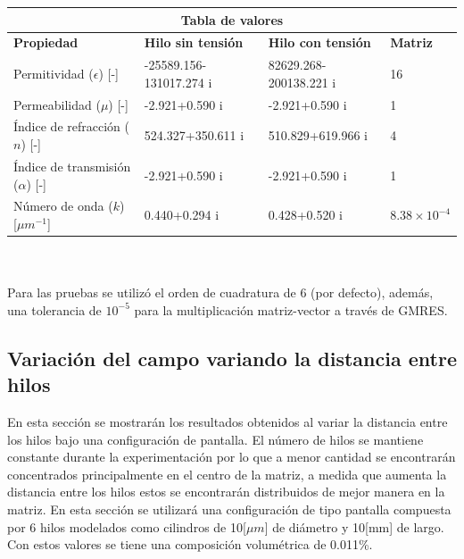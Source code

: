 \documentclass[12pt,letterpaper]{article}
\numberwithin{equation}{section}
\begin{document}
\hspace{-15mm}
\begin{tabular}{ |p{4.78cm}||p{4.5cm}|p{4.5cm}|p{3cm}|  }
	\hline
	\multicolumn{4}{|c|}{\textbf{Tabla de valores}} \\
	\hline
	\textbf{Propiedad} & \textbf{Hilo sin tensión} & \textbf{Hilo con tensión} & \textbf{Matriz}\\
	\hline
	Permitividad ($\epsilon$) [-]  & -25589.156-131017.274 i   & 82629.268-200138.221 i & 16\\
	Permeabilidad ($\mu$) [-]&   -2.921+0.590 i  & -2.921+0.590 i & 1\\
	Índice de refracción ($n$) [-] & 524.327+350.611 i & 510.829+619.966 i & 4\\
	Índice de transmisión ($\alpha$) [-]   & -2.921+0.590 i & -2.921+0.590 i & 1\\
	Número de onda ($k$) [$\mu m^{-1}$] & 0.440+0.294 i & 0.428+0.520 i &$8.38\times 10^{-4}$\\
	\hline
\end{tabular}
\\\\

Para las pruebas se utilizó el orden de cuadratura de 6 (por defecto), además, una tolerancia de $10^{-5}$ para la multiplicación matriz-vector a través de GMRES.

\pagebreak
\subsection{Variación del campo variando la distancia entre hilos}
En esta sección se mostrarán los resultados obtenidos al variar la distancia entre los hilos bajo una configuración de pantalla. El número de hilos se mantiene constante durante la experimentación por lo que a menor cantidad se encontrarán concentrados principalmente en el centro de la matriz, a medida que aumenta la distancia entre los hilos estos se encontrarán distribuidos de mejor manera en la matriz. En esta sección se utilizará una configuración de tipo pantalla compuesta por 6 hilos modelados como cilindros de 10[$\mu m$] de diámetro y 10[mm] de largo. Con estos valores se tiene una composición volumétrica de 0.011\%.
\end{document}
